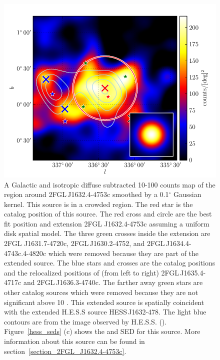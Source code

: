 \documentclass[12pt,preprint]{aastex}
\newcommand{\gev}{\text{GeV}\xspace}
\newcommand{\tev}{\text{TeV}\xspace}
\renewcommand{\deg}{\ensuremath{^\circ}\xspace}
\begin{document}
\begin{figure}
  \begin{center}
    \includegraphics[type=pdf,ext=.pdf,read=.pdf]{source_plots/source_1FGL_J1632.9-4802c}
  \end{center}
  \caption{A Galactic and isotropic diffuse subtracted 10-100
  \gev counts map of the region around 2FGL\,J1632.4-4753c smoothed by
  a 0.1\deg Gaussian kernel.  This source is in a crowded region.
  The red star is the catalog position of this source.  The red
  cross and circle are the best fit position and extension 2FGL
  J1632.4-4753c assuming a uniform disk spatial model.  The three
  green crosses inside the extension are 2FGL
  J1631.7-4720c, 2FGL\,J1630.2-4752, and 2FGL\,J1634.4-4743c.4-4820c
  which were removed because they are part
  of the extended source.  The blue stars and crosses are the catalog
  positions and the relocalized positions of (from left to right)
  2FGL\,J1635.4-4717c and 2FGL\,J1636.3-4740c.  The farther away green
  stars are other catalog sources which were removed because they are
  not significant above 10 \gev.  This extended source is spatially
  coincident with the extended H.E.S.S source HESS\,J1632-478.
  The light blue contours are from the \tev image observed by H.E.S.S.
  (\cite{hess_plane_survey}).  Figure~\ref{hess_seds} (c) shows the \gev and
  \tev SED for this source.  More information about this source can be
  found in section~\ref{section_2FGL_J1632.4-4753c}.
  }\label{1FGL_J1632.9-4802c}
\end{figure}
\end{document}
